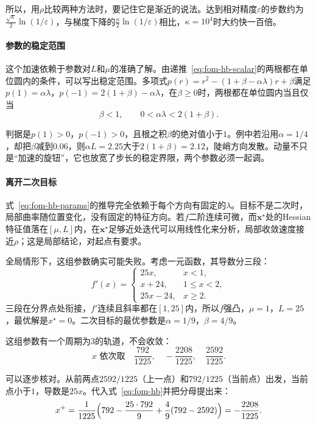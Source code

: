 所以，用$\rho$比较两种方法时，要记住它是渐近的说法。达到相对精度$\varepsilon$的步数约为$\tfrac{\sqrt\kappa}{2}\ln(1/\varepsilon)$，与梯度下降的$\tfrac\kappa2\ln(1/\varepsilon)$相比，$\kappa=10^4$时大约快一百倍。

\paragraph{参数的稳定范围}
这个加速依赖于参数对$L$和$\mu$的准确了解。由递推~\eqref{eq:fom-hb-scalar}的两根都在单位圆内的条件，可以写出稳定范围。多项式$p(r)=r^2-(1+\beta-\alpha\lambda)r+\beta$满足$p(1)=\alpha\lambda$，$p(-1)=2(1+\beta)-\alpha\lambda$，在$\beta\geq0$时，两根都在单位圆内当且仅当
\begin{equation}
 \beta<1,\qquad0<\alpha\lambda<2(1+\beta).
 \label{eq:fom-hb-stable}
\end{equation}

判据是$p(1)>0$，$p(-1)>0$，且根之积$\beta$的绝对值小于$1$。例中若沿用$\alpha=1/4$，却把$\beta$减到$0.06$，则$\alpha L=2.25$大于$2(1+\beta)=2.12$，陡峭方向发散。动量不只是“加速的旋钮”，它也放宽了步长的稳定界限，两个参数必须一起调。

\paragraph{离开二次目标}
式~\eqref{eq:fom-hb-params}的推导完全依赖于每个方向有固定的$\lambda$。目标不是二次时，局部曲率随位置变化，没有固定的特征方向。若$f$二阶连续可微，而$\bm{x}^\star$处的Hessian特征值落在$[\mu,L]$内，在$\bm{x}^\star$足够近处迭代可以用线性化来分析，局部收敛速度接近$\rho$；这是局部结论，对起点有要求。

全局情形下，这组参数确实可能失败。考虑一元函数，其导数分三段：
\begin{equation}
 f'(x)=\begin{cases}
 25x,&x<1,\\
 x+24,&1\leq x<2,\\
 25x-24,&x\geq2.
 \end{cases}
 \label{eq:fom-hb-counterexample}
\end{equation}
三段在分界点处衔接，$f'$连续且斜率都在$[1,25]$内，所以$f$强凸，$\mu=1$，$L=25$，最优解是$x^\star=0$。二次目标的最优参数是$\alpha=1/9$，$\beta=4/9$。

这组参数有一个周期为$3$的轨道，不会收敛：
\[
 x\text{ 依次取}\quad \frac{792}{1225},\quad-\frac{2208}{1225},\quad\frac{2592}{1225}.
\]

可以逐步核对。从前两点$2592/1225$（上一点）和$792/1225$（当前点）出发，当前点小于$1$，导数是$25x$。代入式~\eqref{eq:fom-hb}并把分母提出来：
\[
 x^{+}=\frac{1}{1225}\Bigl(792-\frac{25\cdot792}{9}+\frac49(792-2592)\Bigr)=-\frac{2208}{1225}.
\]

